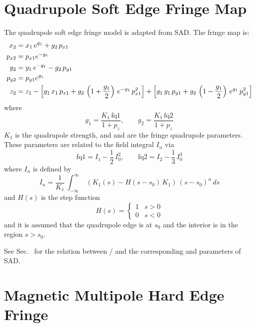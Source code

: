 \section{Quadrupole Soft Edge Fringe Map}
\label{s:q.soft}

The quadrupole soft edge fringe model is adapted from SAD\cite{b:sad}. The fringe map is:
\begin{align}
  x_2 &= x_1 \, e^{g_1} + g_2 \, p_{x1} \nonumber \\
  p_{x2} &= p_{x1} e^{-g_1} \nonumber \\
  y_2 &= y_1 \, e^{-g_1} - g_2 \, p_{y1} \\
  p_{y2} &= p_{y1} e^{g_1} \nonumber \\
  z_2 &= z_1 - 
    \left[g_1 \, x_1 \, p_{x1} + g_2 \, \left( 1 + \frac{g_1}{2} \right)
    \, e^{-g_1} \, p_{x1}^2 \right] + 
    \left[g_1 \, y_1 \, p_{y1} + g_2 \, \left( 1 - \frac{g_1}{2} \right)
    \, e^{g_1} \, p_{y1}^2 \right] \nonumber
\end{align}
where
\begin{equation}
  g_1 = \frac{K_1 \, \text{fq1}}{1 + p_z} , \qquad
  g_2 = \frac{K_1 \, \text{fq2}}{1 + p_z}
\end{equation}
$K_1$ is the quadrupole strength, and  and  are the fringe
quadrupole parameters. These parameters are related to the field integral $I_n$
via
\begin{equation}
  \text{fq1} = I_1 - \frac{1}{2} \, I_0^2 , \qquad
  \text{fq2} = I_2 - \frac{1}{3} \, I_0^3
\end{equation}
where $I_n$ is defined by
\begin{equation}
  I_n = \frac{1}{K_1} \, \int_{-\infty}^{\infty} \; 
    (K_1(s) - H(s-s_0) \, K_1) \, (s - s_0)^n \, ds
\end{equation}
and $H(s)$ is the step function
\begin{equation}
  H(s) = \begin{cases}
    1   & s > 0 \\
    0   & s < 0
  \end{cases}
\end{equation}
and it is assumed that the quadrupole edge is at $s_0$ and the interior is 
in the region $s > s_0$. 

See Sec.~ for the relation between  /  and
the corresponding  and  parameters of SAD.

\section{Magnetic Multipole Hard Edge Fringe}

